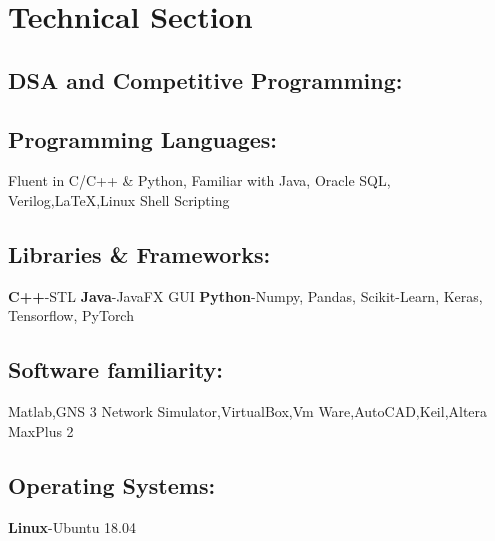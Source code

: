 \documentclass{article}
\begin{document}
\section*{Technical Section}

\subsection*{DSA and Competitive Programming:}

\subsection*{Programming Languages:}
Fluent in C/C++ \& Python, Familiar with Java, Oracle SQL, Verilog,{\LaTeX},Linux Shell Scripting

\subsection*{Libraries \& Frameworks:}
\textbf{C++}-STL
\textbf{Java}-JavaFX GUI
\textbf{Python}-Numpy, Pandas, Scikit-Learn, Keras, Tensorflow, PyTorch

\subsection*{Software familiarity:}
Matlab,GNS 3 Network Simulator,VirtualBox,Vm Ware,AutoCAD,Keil,Altera MaxPlus 2

\subsection*{Operating Systems:}
\textbf{ Linux}-Ubuntu 18.04
\end{document}
